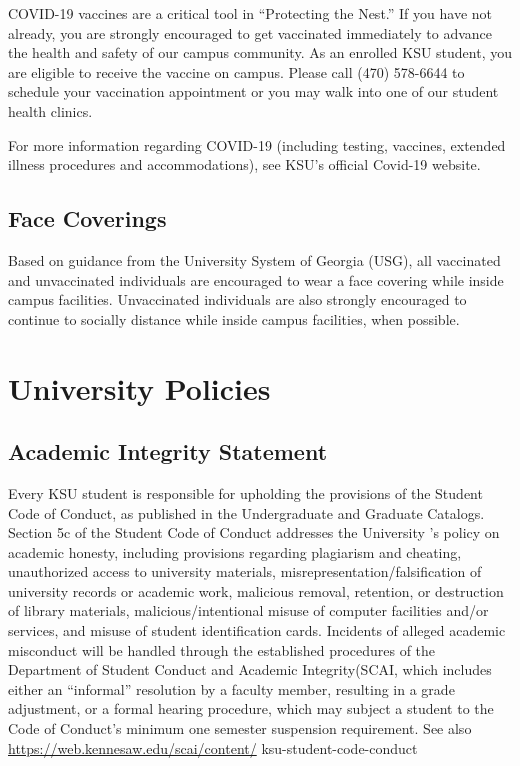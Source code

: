 \documentclass[11pt,]{article}
\begin{document}
COVID-19 vaccines are a critical tool in ``Protecting the Nest.'' If you have not already, you are strongly encouraged to get vaccinated immediately to advance the health and safety of our campus community. As an enrolled KSU student, you are eligible to receive the vaccine on campus. Please call (470) 578-6644 to schedule your vaccination appointment or you may walk into one of our student health clinics.

For more information regarding COVID-19 (including testing, vaccines, extended illness procedures and accommodations), see KSU's official Covid-19 website.

\hypertarget{face-coverings}{%
\subsection{Face Coverings}\label{face-coverings}}

Based on guidance from the University System of Georgia (USG), all vaccinated and unvaccinated individuals are encouraged to wear a face covering while inside campus facilities. Unvaccinated individuals are also strongly encouraged to continue to socially distance while inside campus facilities, when possible.

\hypertarget{university-policies}{%
\section{University Policies}\label{university-policies}}

\hypertarget{academic-integrity-statement}{%
\subsection{Academic Integrity Statement}\label{academic-integrity-statement}}

Every KSU student is responsible for upholding the provisions of the Student Code of Conduct, as published in
the Undergraduate and Graduate Catalogs. Section 5c of the Student Code of Conduct addresses the University
's policy on academic honesty, including provisions regarding plagiarism and cheating, unauthorized access
to university materials, misrepresentation/falsification of university records or academic work, malicious
removal, retention, or destruction of library materials, malicious/intentional misuse of computer facilities and/or
services, and misuse of student identification cards. Incidents of alleged academic misconduct will be
handled through the established procedures of the Department of Student Conduct and Academic
Integrity(SCAI, which includes either an ``informal'' resolution by a faculty member, resulting in a grade
adjustment, or a formal hearing procedure, which may subject a student to the Code of Conduct's
minimum one semester suspension requirement. See also \url{https://web.kennesaw.edu/scai/content/}
ksu-student-code-conduct
\end{document}
